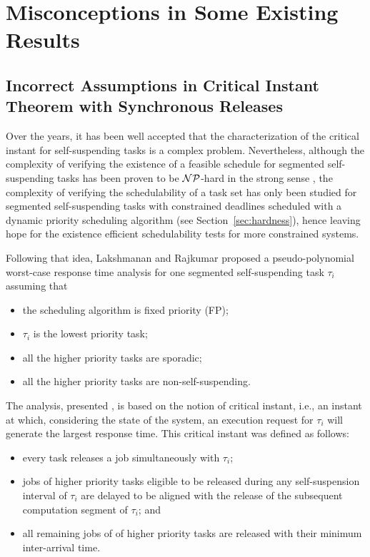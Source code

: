 
\section{Misconceptions in Some Existing Results}
\subsection{Incorrect Assumptions in Critical Instant Theorem with Synchronous Releases}
\label{sec:wrong-critical}

Over the years, it has been well accepted that the characterization of the critical instant for self-suspending tasks is a complex problem. Nevertheless, although the complexity of verifying the existence of a feasible schedule for segmented self-suspending tasks has been proven to be ${\cal NP}$-hard in the strong sense \cite{Ridouard_2004}, the complexity of verifying the schedulability of a task set has only been studied for segmented self-suspending tasks with constrained deadlines scheduled with a dynamic priority scheduling algorithm (see Section~\ref{sec:hardness}), hence leaving hope for the existence efficient schedulability tests for more constrained systems. 

Following that idea, Lakshmanan and Rajkumar proposed a pseudo-polynomial worst-case response time analysis for one segmented self-suspending task $\tau_i$ assuming that 
\begin{itemize}
\item the scheduling algorithm is fixed priority (FP);
\item $\tau_i$ is the lowest priority task; 
\item all the higher priority tasks are sporadic;
\item all the higher priority tasks are non-self-suspending.
\end{itemize}
The analysis, presented \cite{RTAS-LakshmananR10}, is based on the notion of critical instant, i.e., an instant at which, considering the state of the system, an execution request for $\tau_i$ will generate the largest response time. This critical instant was defined as follows:
\begin{itemize}
	\item every task releases a job simultaneously with $\tau_i$;
	\item jobs of higher priority tasks eligible to be released during any self-suspension interval of $\tau_i$ are delayed to be aligned with the release of the subsequent computation segment of $\tau_i$; and
	\item all remaining jobs of of higher priority tasks are released with their minimum inter-arrival time.
\end{itemize}

